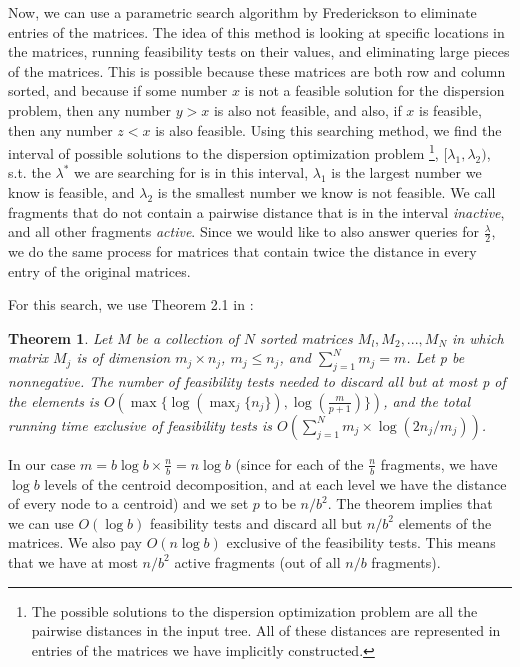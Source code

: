 \documentclass[11pt,a4paper]{article}
\newtheorem{theorem}{Theorem}[section]
\theoremstyle{definition}
\theoremstyle{remark}
\begin{document}
Now, we can use a parametric search algorithm by Frederickson to eliminate entries of the matrices. The idea of this method is looking at specific locations in the matrices, running feasibility tests on their values, and eliminating large pieces of the matrices. This is possible because these matrices are both row and column sorted, and because if some number $x$ is not a feasible solution for the dispersion problem, then any number $y>x$ is also not feasible, and also, if $x$ is feasible, then any number $z<x$ is also feasible. Using this searching method, we find the interval of possible solutions to the dispersion optimization problem \footnote{The possible solutions to the dispersion optimization problem are all the pairwise distances in the input tree. All of these distances are represented in entries of the matrices we have implicitly constructed.}, $[\lambda_1,\lambda_2)$, s.t. the $\lambda^*$ we are searching for is in this interval, $\lambda_1$ is the largest number we know is feasible, and $\lambda_2$ is the smallest number we know is not feasible. We call fragments that do not contain a pairwise distance that is in the interval \textit{inactive}, and all other fragments \textit{active}. Since we would like to also answer queries for $\frac{\lambda}{2}$, we do the same process for matrices that contain twice the distance in every entry of the original matrices.

For this search, we use Theorem 2.1 in \cite{Frederickson1991}:
\begin{theorem}\label{Frederickson's theorem}
Let $M$ be a collection of $N$ sorted matrices ${M_l, M_2, . . . , M_N}$ in which matrix $M_j$ is of dimension $m_j \times n_j$, $m_j \leq n_j$, and $\sum_{j=1}^{N} m_j = m$.
Let p be nonnegative. The number of feasibility tests needed to discard all but at most p of the elements is $O(\max \lbrace \log(\max_{j} \lbrace n_j \rbrace), \log(\frac{m}{p+1}) \rbrace)$, and the total running time exclusive of feasibility tests is $O(\sum_{j=1}^{N} m_j \times \log (2n_j/m_j))$.
\end{theorem}
In our case $m=b \log b \times \frac{n}{b} = n \log b$ (since for each of the $\frac{n}{b}$ fragments, we have $\log b$ levels of the centroid decomposition, and at each level we have the distance of every node to a centroid) and we set $p$ to be $n/b^2$. The theorem implies that we can use $O(\log b)$ feasibility tests and discard all but $n/b^2$ elements of the matrices. We also pay $O(n \log b)$ exclusive of the feasibility tests. This means that we have at most $n/b^2$ active fragments (out of all $n/b$ fragments). 
\end{document}
